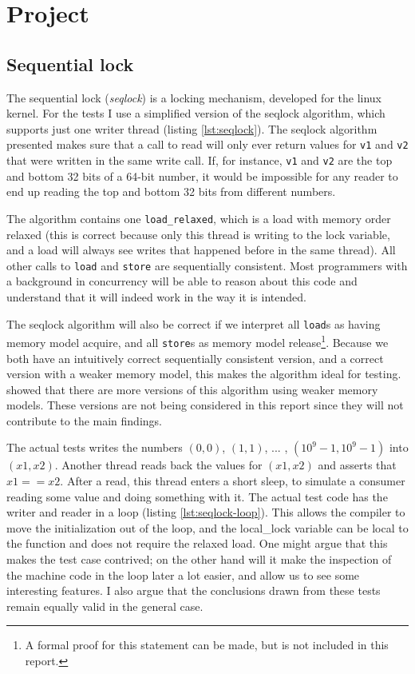 \documentclass[journal]{IEEEtran}
\begin{document}
\section{Project}

\subsection{Sequential lock}
\label{sec:seqlock}

The sequential lock (\emph{seqlock}) is a locking mechanism, developed for the linux kernel.
For the tests I use a simplified version of the seqlock algorithm, which supports just one writer thread (listing \ref{lst:seqlock}).
The seqlock algorithm presented makes sure that a call to read will only ever return values for \texttt{v1} and \texttt{v2} that were written in the same write call.
If, for instance, \texttt{v1} and \texttt{v2} are the top and bottom 32 bits of a 64-bit number, it would be impossible for any reader to end up reading the top and bottom 32 bits from different numbers.



The algorithm contains one \texttt{load\_relaxed}, which is a load with memory order relaxed (this is correct because only this thread is writing to the lock variable, and a load will always see writes that happened before in the same thread).
All other calls to \texttt{load} and \texttt{store} are sequentially consistent.
Most programmers with a background in concurrency will be able to reason about this code and understand that it will indeed work in the way it is intended.

The seqlock algorithm will also be correct if we interpret all \texttt{load}s as having memory model acquire, and all \texttt{store}s as memory model release\footnote{A formal proof for this statement can be made, but is not included in this report.}.
Because we both have an intuitively correct sequentially consistent version, and a correct version with a weaker memory model, this makes the algorithm ideal for testing.
\cite{boehm2012can} showed that there are more versions of this algorithm using weaker memory models.
These versions are not being considered in this report since they will not contribute to the main findings.

The actual tests writes the numbers \((0,0)\), \((1,1)\), ... , \((10^9-1,10^9-1)\) into \((x1,x2)\).
Another thread reads back the values for \((x1,x2)\) and asserts that \(x1==x2\).
After a read, this thread enters a short sleep, to simulate a consumer reading some value and doing something with it.
The actual test code has the writer and reader in a loop (listing \ref{lst:seqlock-loop}).
This allows the compiler to move the initialization out of the loop, and the local\_lock variable can be local to the function and does not require the relaxed load.
One might argue that this makes the test case contrived; on the other hand will it make the inspection of the machine code in the loop later a lot easier, and allow us to see some interesting features.
I also argue that the conclusions drawn from these tests remain equally valid in the general case.
\end{document}

